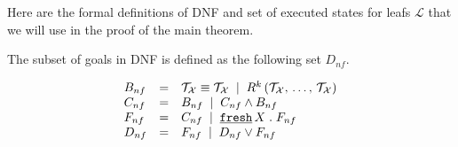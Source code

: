 Here are the formal definitions of DNF and set of executed states for leafs $\mathcal{L}$ that we will use in the proof of the main theorem.

\begin{definition}
The subset of goals in DNF is defined as the following set $D_{nf}$.

\[ \begin{array}{lcl}
B_{nf} & = &  \mathcal{T}_\mathcal{X} \equiv \mathcal{T}_\mathcal{X} \; \mid \;
                     R^k\,(\mathcal{T}_\mathcal{X}, \, \dots, \, \mathcal{T}_\mathcal{X}) \\
C_{nf} & = & B_{nf} \; \mid \; C_{nf} \land B_{nf} \\
F_{nf} & = & C_{nf} \; \mid \; \texttt{\underline {fresh}} \, X\;.\; F_{nf} \\
D_{nf} & = & F_{nf} \; \mid \; D_{nf} \lor F_{nf}
\end{array} \]
\end{definition}

